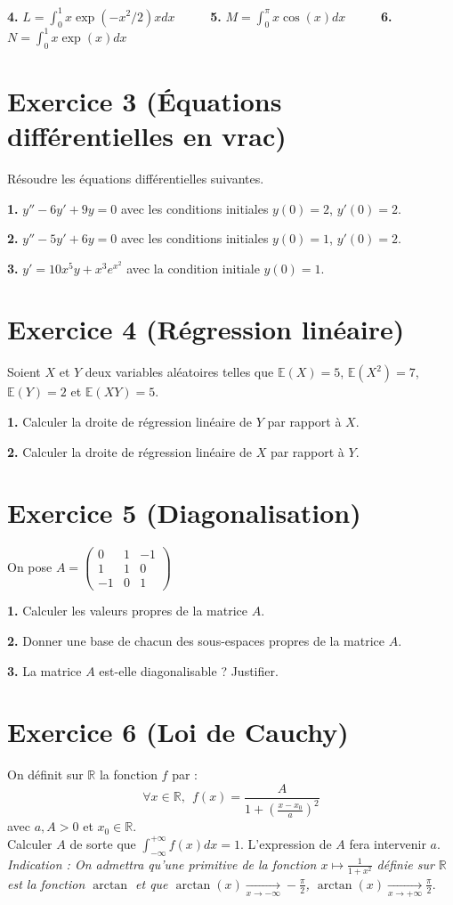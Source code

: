 \documentclass{article}
\newcommand{\E}{\mathbb{E}}
\begin{document}
\textbf{4.} $L=\int_0^1 x \exp{(-x^2/2) x} dx$ \ \ \ \ \ \textbf{5.} $M=\int_0^{\pi} x \cos(x) dx$ \ \ \ \ \ \textbf{6.} $N = \int_0^1 x \exp{(x)} dx$

\section*{Exercice 3 (Équations différentielles en vrac)}

Résoudre les équations différentielles suivantes.

\textbf{1.} $y'' -6y' +9y = 0$ avec les conditions initiales $y(0)=2$, $y'(0)=2$.

\textbf{2.} $y'' -5y' +6y = 0$ avec les conditions initiales $y(0)=1$, $y'(0)=2$.

\textbf{3.} $y' = 10x^5 y + x^3 e^{x^2}$ avec la condition initiale $y(0)=1$.

\section*{Exercice 4 (Régression linéaire)}

Soient $X$ et $Y$ deux variables aléatoires telles que $\E (X)=5$, $\E(X^2) = 7$, $\E (Y)=2$ et $\E (XY) =5$. 

\textbf{1.} Calculer la droite de régression linéaire de $Y$ par rapport à $X$.

\textbf{2.} Calculer la droite de régression linéaire de $X$ par rapport à $Y$.

\section*{Exercice 5 (Diagonalisation)}

On pose $A = \begin{pmatrix}
0 & 1 & -1 \\
1 & 1 & 0 \\
-1 & 0 & 1
\end{pmatrix}$

\textbf{1.} Calculer les valeurs propres de la matrice $A$.

\textbf{2.} Donner une base de chacun des sous-espaces propres de la matrice $A$.

\textbf{3.} La matrice $A$ est-elle diagonalisable ? Justifier.

\section*{Exercice 6 (Loi de Cauchy)}
On définit sur $\mathbb{R}$ la fonction $f$ par : 
$$\forall x \in \mathbb{R}, \ \ f(x)=\frac{A}{1+\left( \frac{x-x_0}{a}  \right)^2}$$ 
avec $a, A >0$ et $x_0 \in \mathbb{R}$.\\

Calculer $A$ de sorte que $\int_{-\infty}^{+ \infty} f(x) dx = 1$. L'expression de $A$ fera intervenir $a$. \\
\textit{Indication : On admettra qu'une primitive de la fonction $x \mapsto \frac{1}{1+x^2}$ définie sur $\mathbb{R}$ est la fonction $\arctan$ et que $\arctan(x) \xrightarrow[x \to -\infty]{} -\frac{\pi}{2}$, $\arctan(x) \xrightarrow[x \to +\infty]{} \frac{\pi}{2}$}.
\end{document}
